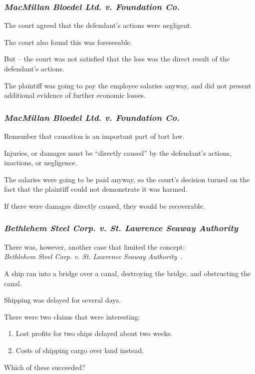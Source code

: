 \begin{frame}
\frametitle{\textit{MacMillan Bloedel Ltd. v. Foundation Co.}}

The court agreed that the defendant's actions were negligent.

The court also found this was foreseeable.

But -- the court was not satisfied that the loss was the direct result of the defendant's actions.

The plaintiff was going to pay the employee salaries anyway, and did not present additional evidence of further economic losses. 

\end{frame}



\begin{frame}
\frametitle{\textit{MacMillan Bloedel Ltd. v. Foundation Co.}}

Remember that causation is an important part of tort law. 

Injuries, or damages must be ``directly caused'' by the defendant's actions, inactions, or negligence. 

The salaries were going to be paid anyway, so the court's decision turned on the fact that the plaintiff could not demonstrate it was harmed.

If there were damages directly caused, they would be recoverable.

\end{frame}



\begin{frame}
\frametitle{\textit{Bethlehem Steel Corp. v. St. Lawrence Seaway Authority}}

There was, however, another case that limited the concept: \\
\quad \textit{Bethlehem Steel Corp. v. St. Lawrence Seaway Authority}~\cite{lpe}.

A ship ran into a bridge over a canal, destroying the bridge, and obstructing the canal.

Shipping was delayed for several days.

There were two claims that were interesting:

\begin{enumerate}
	\item Lost profits for two ships delayed about two weeks.
	\item Costs of shipping cargo over land instead.
\end{enumerate}

Which of these succeeded?

\end{frame}



